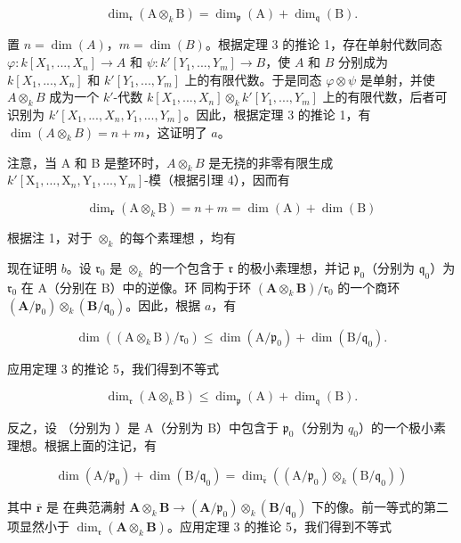 \[
\dim_ {\mathfrak {r}} (\mathrm{A} \otimes_ {k} \mathrm{B}) = \dim_ {\mathfrak {p}} (\mathrm{A}) + \dim_ {\mathfrak {q}} (\mathrm{B}).
\]

置 \(n = \dim(A)\)，\(m = \dim(B)\)。根据定理 3 的推论 1，存在单射代数同态 \(\varphi: k[X_1, ..., X_n] \to A\) 和 \(\psi: k'[Y_1, ..., Y_m] \to B\)，使 \(A\) 和 \(B\) 分别成为 \(k[X_1, ..., X_n]\) 和 \(k'[Y_1, ..., Y_m]\) 上的有限代数。于是同态 \(\varphi \otimes \psi\) 是单射，并使 \(A \otimes_k B\) 成为一个 \(k'\)-代数 \(k[X_1, ..., X_n] \otimes_k k'[Y_1, ..., Y_m]\) 上的有限代数，后者可识别为 \(k'[X_1, ..., X_n, Y_1, ..., Y_m]\)。因此，根据定理 3 的推论 1，有 \(\dim(A \otimes_k B) = n + m\)，这证明了 \(a\)。

注意，当 A 和 B 是整环时，\(A \otimes_k B\) 是无挠的非零有限生成 \(k'[\mathrm{X}_{1}, \ldots, \mathrm{X}_{n}, \mathrm{Y}_{1}, \ldots, \mathrm{Y}_{m}]\)-模（根据引理 4），因而有

\[
\dim_ {\mathbf {r}} (\mathrm{A} \otimes_ {k} \mathrm{B}) = n + m = \dim (\mathrm{A}) + \dim (\mathrm{B})
\]

  根据注 1，对于 \(\otimes_{k}\) 的每个素理想  ，均有

现在证明 \(b\)。设 \(\mathfrak{r}_{0}\) 是 \(\otimes_{k}\) 的一个包含于 \(\mathfrak{r}\) 的极小素理想，并记 \(\mathfrak{p}_{0}\)（分别为 \(\mathfrak{q}_{0}\)）为 \(\mathfrak{r}_{0}\) 在 A（分别在 B）中的逆像。环  同构于环 \((\mathbf{A} \otimes_k \mathbf{B}) / \mathfrak{r}_{0}\) 的一个商环 \((\mathbf{A} / \mathfrak{p}_{0}) \otimes_k (\mathbf{B} / \mathfrak{q}_{0})\)。因此，根据 \(a\)，有

\[
\dim \left(\left(\mathrm{A} \otimes_ {k} \mathrm{B}\right) / \mathfrak {r} _ {0}\right) \leqslant \dim (\mathrm{A} / \mathfrak {p} _ {0}) + \dim (\mathrm{B} / \mathfrak {q} _ {0}).
\]

应用定理 3 的推论 5，我们得到不等式

\[
\dim_ {\mathfrak {r}} (\mathrm{A} \otimes_ {k} \mathrm{B}) \leqslant \dim_ {\mathfrak {p}} (\mathrm{A}) + \dim_ {\mathfrak {q}} (\mathrm{B}).
\]

反之，设  （分别为 ）是 A（分别为 B）中包含于 \(\mathfrak{p}_{0}\)（分别为 \(q_{0}\)）的一个极小素理想。根据上面的注记，有

\[
\dim (\mathrm{A} / \mathfrak {p} _ {0}) + \dim (\mathrm{B} / \mathfrak {q} _ {0}) = \dim_ {\overline {{\mathfrak {r}}}} ((\mathrm{A} / \mathfrak {p} _ {0}) \otimes_ {k} (\mathrm{B} / \mathfrak {q} _ {0}))
\]

其中 \(\overline{\mathbf{r}}\) 是  在典范满射 \(\mathbf{A} \otimes_{k} \mathbf{B} \to (\mathbf{A}/\mathfrak{p}_{0}) \otimes_{k} (\mathbf{B}/\mathfrak{q}_{0})\) 下的像。前一等式的第二项显然小于 \(\dim_{\mathfrak{r}}(\mathbf{A} \otimes_{k} \mathbf{B})\)。应用定理 3 的推论 5，我们得到不等式

